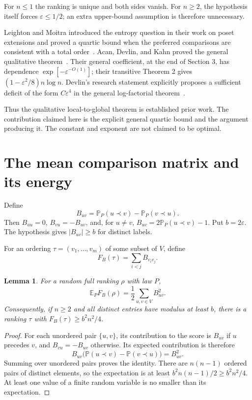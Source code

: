 \documentclass[11pt,a4paper]{article}
\newtheorem{lemma}[theorem]{Lemma}
\newcommand{\E}{\mathbb E}
\newcommand{\Prb}{\mathbb P}
\newcommand{\eps}{\varepsilon}
\begin{document}
For $n\leq1$ the ranking is unique and both sides vanish. For $n\geq2$, the
hypothesis itself forces $\eps\leq1/2$; an extra upper-bound assumption is
therefore unnecessary.

Leighton and Moitra introduced the entropy question in their work on poset
extensions and proved a quartic bound when the preferred comparisons are
consistent with a total order~\cite{LM}. Acan, Devlin, and Kahn proved the
general qualitative theorem~\cite{ADK}. Their general coefficient, at the
end of Section 3, has dependence $\exp[-\eps^{-O(1)}]$; their transitive
Theorem 2 gives $(1-\eps^2/8)n\log n$. Devlin's research statement explicitly
proposes a sufficient deficit of the form $C\eps^4$ in the general
log-factorial theorem~\cite{Devlin}.

Thus the qualitative local-to-global theorem is established prior work.
The contribution claimed here is the explicit general quartic bound and
the argument producing it. The constant and exponent are not claimed to be
optimal. 

\section{The mean comparison matrix and its energy}

Define
\[
B_{uv}=\Prb_P(u\prec v)-\Prb_P(v\prec u).
\]
Then $B_{uu}=0$, $B_{vu}=-B_{uv}$, and, for $u\ne v$,
$B_{uv}=2\Prb_P(u\prec v)-1$. Put $b=2\eps$. The hypothesis gives
$|B_{uv}|\geq b$ for distinct labels.

For an ordering $\tau=(v_1,\ldots,v_m)$ of some subset of $V$, define
\[
F_B(\tau)=\sum_{i<j}B_{v_i v_j}.
\]

\begin{lemma}\label{lem:energy}
For a random full ranking $\rho$ with law $P$,
\[
\E_P F_B(\rho)=\frac12\sum_{u,v\in V}B_{uv}^2.
\]
Consequently, if $n\geq2$ and all distinct entries have modulus at least $b$,
there is a ranking $\tau$ with $F_B(\tau)\geq b^2n^2/4$.
\end{lemma}
\begin{proof}
For each unordered pair $\{u,v\}$, its contribution to the score is $B_{uv}$
if $u$ precedes $v$, and $B_{vu}=-B_{uv}$ otherwise. Its expected contribution
is therefore
\[
B_{uv}\bigl(\Prb(u\prec v)-\Prb(v\prec u)\bigr)=B_{uv}^2.
\]
Summing over unordered pairs proves the identity. There are $n(n-1)$
ordered pairs of distinct elements, so the expectation is at least
$b^2n(n-1)/2\geq b^2n^2/4$. At least one value of a finite random variable
is no smaller than its expectation.
\end{proof}
\end{document}
